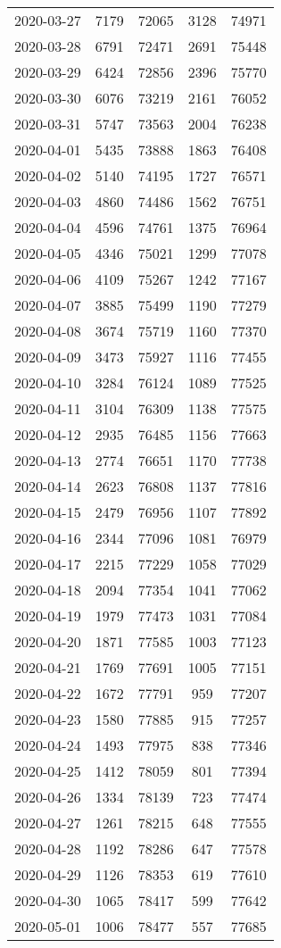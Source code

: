 \begin{longtable}{ccccc}
2020-03-27&7179&72065&3128&74971\\
2020-03-28&6791&72471&2691&75448\\
2020-03-29&6424&72856&2396&75770\\
2020-03-30&6076&73219&2161&76052\\
2020-03-31&5747&73563&2004&76238\\
2020-04-01&5435&73888&1863&76408\\
2020-04-02&5140&74195&1727&76571\\
2020-04-03&4860&74486&1562&76751\\
2020-04-04&4596&74761&1375&76964\\
2020-04-05&4346&75021&1299&77078\\
2020-04-06&4109&75267&1242&77167\\
2020-04-07&3885&75499&1190&77279\\
2020-04-08&3674&75719&1160&77370\\
2020-04-09&3473&75927&1116&77455\\
2020-04-10&3284&76124&1089&77525\\
2020-04-11&3104&76309&1138&77575\\
2020-04-12&2935&76485&1156&77663\\
2020-04-13&2774&76651&1170&77738\\
2020-04-14&2623&76808&1137&77816\\
2020-04-15&2479&76956&1107&77892\\
2020-04-16&2344&77096&1081&76979\\
2020-04-17&2215&77229&1058&77029\\
2020-04-18&2094&77354&1041&77062\\
2020-04-19&1979&77473&1031&77084\\
2020-04-20&1871&77585&1003&77123\\
2020-04-21&1769&77691&1005&77151\\
2020-04-22&1672&77791&959&77207\\
2020-04-23&1580&77885&915&77257\\
2020-04-24&1493&77975&838&77346\\
2020-04-25&1412&78059&801&77394\\
2020-04-26&1334&78139&723&77474\\
2020-04-27&1261&78215&648&77555\\
2020-04-28&1192&78286&647&77578\\
2020-04-29&1126&78353&619&77610\\
2020-04-30&1065&78417&599&77642\\
2020-05-01&1006&78477&557&77685\\
\hline
\end{longtable}